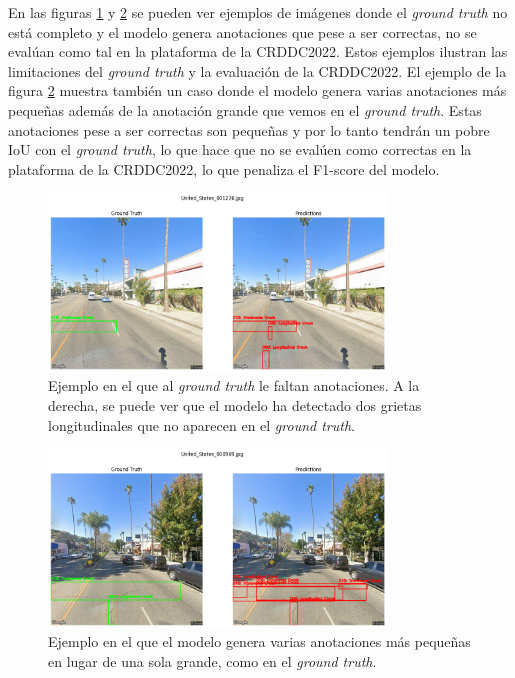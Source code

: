 En las figuras \ref{fig:ground_truth_example_1} y \ref{fig:ground_truth_example_4} se pueden ver ejemplos de imágenes donde el \textit{ground truth} no está completo y el modelo genera anotaciones que pese a ser correctas, no se evalúan como tal en la plataforma de la CRDDC2022. Estos ejemplos ilustran las limitaciones del \textit{ground truth} y la evaluación de la CRDDC2022. El ejemplo de la figura \ref{fig:ground_truth_example_4} muestra también un caso donde el modelo genera varias anotaciones más pequeñas además de la anotación grande que vemos en el \textit{ground truth}. Estas anotaciones pese a ser correctas son pequeñas y por lo tanto tendrán un pobre IoU con el \textit{ground truth}, lo que hace que no se evalúen como correctas en la plataforma de la CRDDC2022, lo que penaliza el F1-score del modelo.

\begin{figure}[H]
    \centering
    \includegraphics[width=0.8\textwidth]{img/ground_truth_example_1.png}
    \caption{Ejemplo en el que al \textit{ground truth} le faltan anotaciones. A la derecha, se puede ver que el modelo ha detectado dos grietas longitudinales que no aparecen en el \textit{ground truth}.}
    \label{fig:ground_truth_example_1}
\end{figure}

\begin{figure}[H]
    \centering
    \includegraphics[width=0.8\textwidth]{img/ground_truth_example_4.png}
    \caption{Ejemplo en el que el modelo genera varias anotaciones más pequeñas en lugar de una sola grande, como en el \textit{ground truth}.}
    \label{fig:ground_truth_example_4}
\end{figure}

